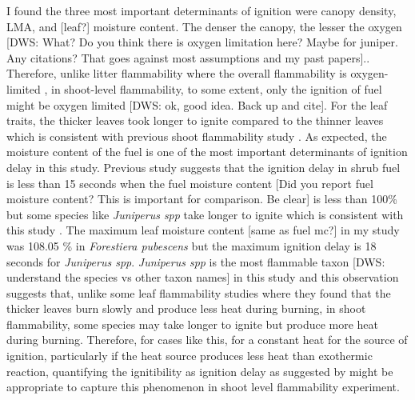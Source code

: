 \documentclass[12pt]{report}
\begin{document}
I found the three most important determinants of ignition were canopy density, LMA, and [leaf?] moisture content. The denser the canopy, the lesser the oxygen [DWS: What? Do you think there is oxygen limitation here?  Maybe for juniper. Any citations? That goes against most assumptions and my past papers].. Therefore, unlike litter flammability where the overall flammability is oxygen-limited \citep{schwilk2015dimensions}, in shoot-level flammability, to some extent, only the ignition of fuel might be oxygen limited [DWS: ok, good idea. Back up and cite]. For the leaf traits, the thicker leaves took longer to ignite compared to the thinner leaves which is consistent with previous shoot flammability study \citep{alam2020shoot}. As expected, the moisture content of the fuel is one of the most important determinants of ignition delay in this study. Previous study suggests that the ignition delay in shrub fuel is less than 15 seconds when the fuel moisture content [Did you report fuel moisture content? This is important for comparison. Be clear] is less than 100\% but some species like \emph{Juniperus spp} take longer to ignite which is consistent with this study \citep{dimitrakopoulos2001flammability,pellizzaro2007seasonal}. The maximum leaf moisture content [same as fuel mc?] in my study was 108.05 \% in \emph{Forestiera pubescens} but the maximum ignition delay is 18 seconds for \emph{Juniperus spp}. \emph{Juniperus spp} is the most flammable taxon [DWS: understand the species vs other taxon names] in this study and this observation suggests that, unlike some leaf flammability studies where they found that the thicker leaves burn slowly and produce less heat during burning, in shoot flammability, some species may take longer to ignite but produce more heat during burning. Therefore, for cases like this, for a constant heat for the source of ignition, particularly if the heat source produces less heat than exothermic reaction, quantifying the ignitibility as ignition delay as suggested by \citep{anderson1970forest} might be appropriate to capture this phenomenon in shoot level flammability experiment.
\end{document}
